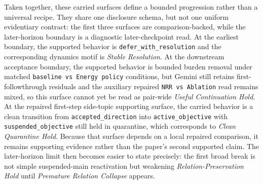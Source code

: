 \documentclass[11pt]{article}
\begin{document}
Taken together, these carried surfaces define a bounded progression rather than
a universal recipe. They share one disclosure schema, but not one uniform
evidentiary contract: the first three surfaces are comparison-backed, while the
later-horizon boundary is a diagnostic later-checkpoint read. At the earliest
boundary, the supported behavior is
\texttt{defer\_with\_resolution} and the corresponding dynamics motif is
\textit{Stable Resolution}. At the downstream acceptance boundary, the
supported behavior is bounded burden removal under matched \texttt{baseline vs
Energy policy} conditions, but Gemini still retains first-followthrough
residuals and the auxiliary repaired \texttt{NRR vs Ablation} read remains
mixed, so this surface cannot yet be read as pair-wide \textit{Useful
Continuation Hold}. At the repaired first-step side-topic supporting surface,
the carried behavior is a clean transition from
\texttt{accepted\_direction} into \texttt{active\_objective} with
\texttt{suspended\_objective} still held in quarantine, which corresponds to
\textit{Clean Quarantine Hold}. Because that surface depends on a local
repaired comparison, it remains supporting evidence rather than the paper's
second supported claim. The later-horizon limit then becomes easier to state
precisely: the first broad break is not simple suspended-main reactivation but
weakening \textit{Relation-Preservation Hold} until \textit{Premature
Relation Collapse} appears.
\end{document}

